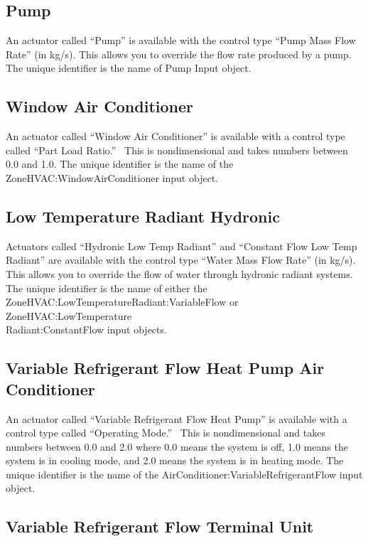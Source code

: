 \subsection{Pump}\label{pump}

An actuator called ``Pump'' is available with the control type ``Pump Mass Flow Rate'' (in kg/s). This allows you to override the flow rate produced by a pump. The unique identifier is the name of Pump Input object.

\subsection{Window Air Conditioner}\label{window-air-conditioner}

An actuator called ``Window Air Conditioner'' is available with a control type called ``Part Load Ratio.''~ This is nondimensional and takes numbers between 0.0 and 1.0. The unique identifier is the name of the ZoneHVAC:WindowAirConditioner input object.

\subsection{Low Temperature Radiant Hydronic}\label{low-temperature-radiant-hydronic}

Actuators called ``Hydronic Low Temp Radiant'' and ``Constant Flow Low Temp Radiant'' are available with the control type ``Water Mass Flow Rate'' (in kg/s). This allows you to override the flow of water through hydronic radiant systems. The unique identifier is the name of either the ZoneHVAC:LowTemperatureRadiant:VariableFlow or ZoneHVAC:LowTemperature\\
Radiant:ConstantFlow input objects.

\subsection{Variable Refrigerant Flow Heat Pump Air Conditioner}\label{variable-refrigerant-flow-heat-pump-air-conditioner}

An actuator called ``Variable Refrigerant Flow Heat Pump'' is available with a control type called ``Operating Mode.''~ This is nondimensional and takes numbers between 0.0 and 2.0 where 0.0 means the system is off, 1.0 means the system is in cooling mode, and 2.0 means the system is in heating mode. The unique identifier is the name of the AirConditioner:VariableRefrigerantFlow input object.

\subsection{Variable Refrigerant Flow Terminal Unit}\label{variable-refrigerant-flow-terminal-unit}


